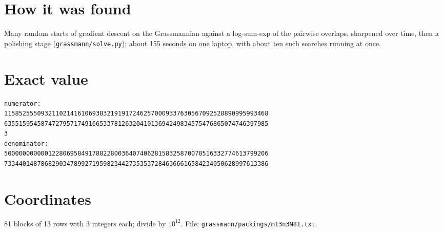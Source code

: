 \documentclass[11pt,a4paper]{article}
\begin{document}
\section{How it was found}
Many random starts of gradient descent on the Grassmannian against a log-sum-exp of the pairwise overlaps, sharpened over time, then a polishing stage (\texttt{grassmann/solve.py}); about 155 seconds on one laptop, with about ten such searches running at once.


\appendix
\section{Exact value}
{\small
\begin{verbatim}
numerator:
115852555093211021416106938321919172462570009337630567092528890995993468
635515954587472795717491665337812632041013694249834575476865074746397985
3
denominator:
500000000000122806958491788228003640740628158325870070516332774613799206
733440148786829034789927195982344273535372846366616584234050628997613386
\end{verbatim}}

\section{Coordinates}
81 blocks of 13 rows with 3 integers each; divide by $10^{12}$. File: \texttt{grassmann/packings/m13n3N81.txt}.
{\tiny
\begin{multicols}{3}
\end{multicols}}
\end{document}
